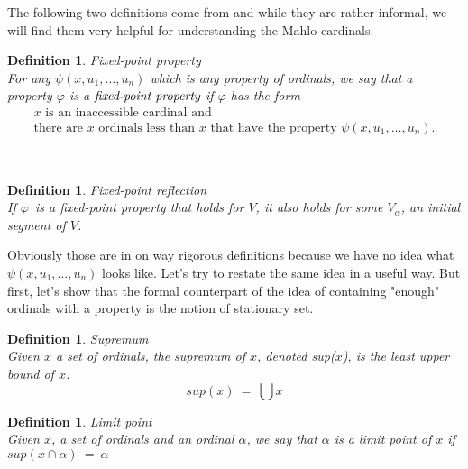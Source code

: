 \documentclass[12pt,a4paper]{article}
\newtheorem{definition}[theorem]{Definition}
\begin{document}
\begin{}
The following two definitions come from \cite{Infinity_in_mind} and while they are rather informal, we will find them very helpful for understanding the Mahlo cardinals.
\begin{definition}{Fixed-point property}\\
For any $\psi(x, u_1, \ldots, u_n)$ which is any property of ordinals, we say that a property $\varphi$ is a $\emph{fixed-point property}$ if $\varphi$ has the form
\begin{equation}
\begin{gathered}
\mbox{$x$ is an inaccessible cardinal and }\\
\mbox{there are $x$ ordinals less than $x$ that have the property $\psi(x, u_1, \ldots, u_n)$.}
\end{gathered}
\end{equation}
\end{definition}

\

\begin{definition}{Fixed-point reflection}\\
If $\varphi$ is a fixed-point property that holds for $V$, it also holds for some $V_\alpha$, an initial segment of $V$.
\end{definition}

Obviously those are in on way rigorous definitions because we have no idea what $\psi(x, u_1, \ldots, u_n)$ looks like. Let's try to restate the same idea in a useful way. But first, let's show that the formal counterpart of the idea of containing "enough" ordinals with a property is the notion of stationary set. 

\begin{definition}{Supremum}\\
Given $x$ a set of ordinals, the supremum of $x$, denoted sup($x$), is the least upper bound of $x$. %
\begin{equation}
sup(x)\ =\ \bigcup x
\end{equation}
\end{definition}

\begin{definition}{Limit point}\\
Given $x$, a set of ordinals and an ordinal $\alpha$, we say that $\alpha$ is a \emph{limit point} of $x$ if $sup(x \cap \alpha)\ =\ \alpha$
\end{definition}


\end{}
\end{document}
